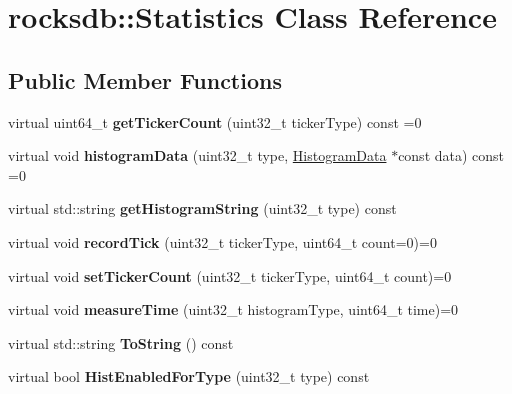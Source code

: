 \hypertarget{classrocksdb_1_1Statistics}{}\section{rocksdb\+:\+:Statistics Class Reference}
\label{classrocksdb_1_1Statistics}
\subsection*{Public Member Functions}
\begin{DoxyCompactItemize}
\item 
virtual uint64\+\_\+t {\bfseries get\+Ticker\+Count} (uint32\+\_\+t ticker\+Type) const =0\hypertarget{classrocksdb_1_1Statistics_abfdd7fbe79971830300cf9bd008ebf14}{}\label{classrocksdb_1_1Statistics_abfdd7fbe79971830300cf9bd008ebf14}

\item 
virtual void {\bfseries histogram\+Data} (uint32\+\_\+t type, \hyperlink{structrocksdb_1_1HistogramData}{Histogram\+Data} $\ast$const data) const =0\hypertarget{classrocksdb_1_1Statistics_a2e93e4c0fb45b757838ef282d0ef2115}{}\label{classrocksdb_1_1Statistics_a2e93e4c0fb45b757838ef282d0ef2115}

\item 
virtual std\+::string {\bfseries get\+Histogram\+String} (uint32\+\_\+t type) const\hypertarget{classrocksdb_1_1Statistics_a19a264254ca795621de077acbb39d04a}{}\label{classrocksdb_1_1Statistics_a19a264254ca795621de077acbb39d04a}

\item 
virtual void {\bfseries record\+Tick} (uint32\+\_\+t ticker\+Type, uint64\+\_\+t count=0)=0\hypertarget{classrocksdb_1_1Statistics_a9e4f8fa4f0aaab6712b3eed84acc1dcc}{}\label{classrocksdb_1_1Statistics_a9e4f8fa4f0aaab6712b3eed84acc1dcc}

\item 
virtual void {\bfseries set\+Ticker\+Count} (uint32\+\_\+t ticker\+Type, uint64\+\_\+t count)=0\hypertarget{classrocksdb_1_1Statistics_abe05f7d58dcc8c57d2c797f4e011cbd9}{}\label{classrocksdb_1_1Statistics_abe05f7d58dcc8c57d2c797f4e011cbd9}

\item 
virtual void {\bfseries measure\+Time} (uint32\+\_\+t histogram\+Type, uint64\+\_\+t time)=0\hypertarget{classrocksdb_1_1Statistics_a1f7997dd2421c01300ba765f58322987}{}\label{classrocksdb_1_1Statistics_a1f7997dd2421c01300ba765f58322987}

\item 
virtual std\+::string {\bfseries To\+String} () const\hypertarget{classrocksdb_1_1Statistics_af38dfb62262cb24210ca5a951eb6b710}{}\label{classrocksdb_1_1Statistics_af38dfb62262cb24210ca5a951eb6b710}

\item 
virtual bool {\bfseries Hist\+Enabled\+For\+Type} (uint32\+\_\+t type) const\hypertarget{classrocksdb_1_1Statistics_add318f6785d0f2ed2b80de01e952bca6}{}\label{classrocksdb_1_1Statistics_add318f6785d0f2ed2b80de01e952bca6}

\end{DoxyCompactItemize}
